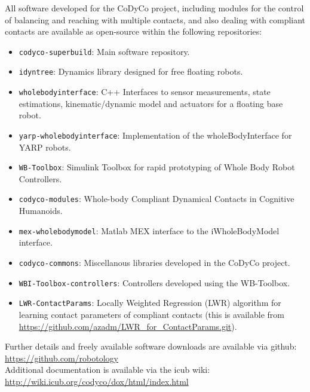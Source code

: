 \documentclass[12pt,a4paper,twoside]{article}
\begin{document}
All software developed for the CoDyCo project, including modules for the
control of balancing and reaching with multiple contacts, and also dealing
with compliant contacts are available as open-source within the following
repositories:
\begin{itemize}
\item \texttt{codyco-superbuild}: Main software repository.
\item \texttt{idyntree}: Dynamics library designed for free floating robots.
\item \texttt{wholebodyinterface}: C++ Interfaces to sensor measurements,
  state estimations, kinematic/dynamic model and actuators for a floating base
  robot.
\item \texttt{yarp-wholebodyinterface}: Implementation of the
  wholeBodyInterface for YARP robots.
\item \texttt{WB-Toolbox}: Simulink Toolbox for rapid prototyping of Whole
  Body Robot Controllers.
\item \texttt{codyco-modules}: Whole-body Compliant Dynamical Contacts in
  Cognitive Humanoids.
\item \texttt{mex-wholebodymodel}: Matlab MEX interface to the iWholeBodyModel
  interface.
\item \texttt{codyco-commons}: Miscellanous libraries developed in the CoDyCo
  project.
\item \texttt{WBI-Toolbox-controllers}: Controllers developed using the
  WB-Toolbox.
\item \texttt{LWR-ContactParams}: Locally Weighted Regression (LWR) algorithm
  for learning contact parameters of compliant contacts (this is available
  from \url{https://github.com/azadm/LWR_for_ContactParams.git}).
\end{itemize}

Further details and freely available software downloads are available via
github: \\ \url{https://github.com/robotology} \\

Additional documentation is available via the icub wiki: \\
\url{http://wiki.icub.org/codyco/dox/html/index.html} \\
\end{document}
